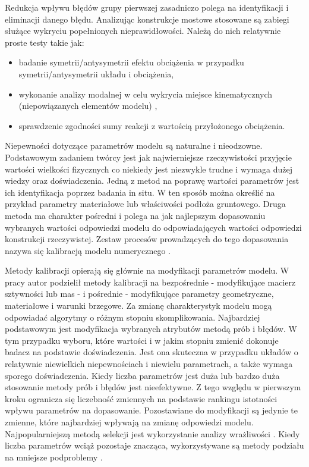 Redukcja wpływu błędów grupy pierwszej zasadniczo polega na identyfikacji i eliminacji danego błędu. Analizując konstrukcje mostowe stosowane są zabiegi służące wykryciu popełnionych nieprawidłowości. Należą do nich relatywnie proste testy takie jak:
\begin{itemize}
	\item badanie symetrii/antysymetrii efektu obciążenia w przypadku symetrii/antysymetrii układu i obciążenia,
	\item wykonanie analizy modalnej w celu wykrycia miejsce kinematycznych (niepowiązanych elementów modelu) \parencite{Szafranski2013a}, 
	\item sprawdzenie zgodności sumy reakcji z wartością przyłożonego obciążenia. 
\end{itemize}


Niepewności dotyczące parametrów modelu są naturalne i nieodzowne. Podstawowym zadaniem twórcy jest jak najwierniejsze rzeczywistości przyjęcie wartości wielkości fizycznych co niekiedy jest niezwykle trudne i wymaga dużej wiedzy oraz doświadczenia. Jedną z metod na poprawę wartości parametrów jest ich  identyfikacja poprzez badania in situ. W ten sposób można określić na przykład parametry materiałowe lub właściwości podłoża gruntowego. Druga metoda ma charakter pośredni i polega na jak najlepszym dopasowaniu wybranych wartości odpowiedzi modelu do odpowiadających wartości odpowiedzi konstrukcji rzeczywistej. Zestaw procesów prowadzących do tego dopasowania nazywa się kalibracją modelu numerycznego . 

Metody kalibracji opierają się głównie na modyfikacji parametrów modelu. W pracy \cite{Batou2019} autor podzielił metody kalibracji na bezpośrednie - modyfikujące macierz sztywności lub mas - i pośrednie - modyfikujące parametry geometryczne, materiałowe i warunki brzegowe. Za zmianę charakterystyk modelu mogą odpowiadać algorytmy o różnym stopniu skomplikowania. Najbardziej podstawowym jest modyfikacja wybranych atrybutów metodą prób i błędów. W tym przypadku wyboru, które wartości i w jakim stopniu zmienić dokonuje badacz na podstawie doświadczenia. Jest ona skuteczna w przypadku układów o relatywnie niewielkich niepewnościach i niewielu parametrach, a także wymaga sporego doświadczenia. Kiedy liczba parametrów jest duża lub bardzo duża stosowanie metody prób i błędów jest nieefektywne. Z tego względu w pierwszym kroku ogranicza się liczebność zmiennych na podstawie rankingu istotności wpływu parametrów na dopasowanie. Pozostawiane do modyfikacji są jedynie te zmienne, które najbardziej wpływają na zmianę odpowiedzi modelu. Najpopularniejszą metodą selekcji jest wykorzystanie analizy wrażliwości \parencite{Friswell2001,Mottershead2011,Petersen2017,Batou2019}.  Kiedy liczba parametrów wciąż pozostaje znacząca, wykorzystywane są metody podziału na mniejsze podproblemy \parencite{Weng2020,Yu2016}. 

